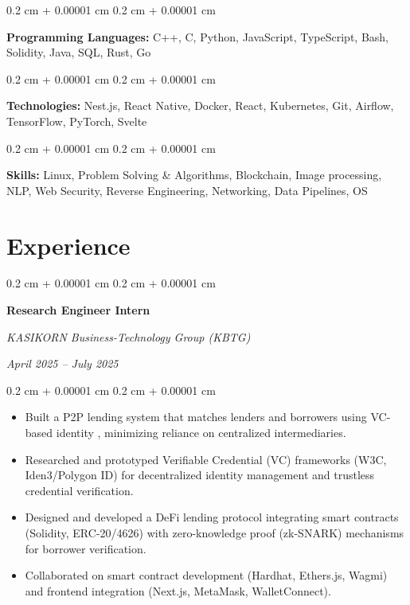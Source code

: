 \documentclass[10pt,letterpaper]{extarticle}
\newenvironment{highlights}{
    \begin{itemize}[
        topsep=0.10 cm,
        parsep=0.10 cm,
        partopsep=0pt,
        itemsep=0pt,
        leftmargin=0.4 cm + 10pt
    ]
}{
    \end{itemize}
} %
\newenvironment{onecolentry}{
    \begin{adjustwidth}{
        0.2 cm + 0.00001 cm
    }{
        0.2 cm + 0.00001 cm
    }
}{
    \end{adjustwidth}
} %
\newenvironment{twocolentry}[2][]{
    \onecolentry
    \def\secondColumn{#2}
    \setcolumnwidth{\fill, 5.0 cm}
    \begin{paracol}{2}
}{
    \switchcolumn \raggedleft \secondColumn
    \end{paracol}
    \endonecolentry
} %
\begin{document}
        \begin{onecolentry}
            \textbf{Programming Languages:} C++, C, Python, JavaScript, TypeScript, Bash, Solidity, Java, SQL, Rust, Go
        \end{onecolentry}


        \begin{onecolentry}
            \textbf{Technologies:} Nest.js, React Native, Docker, React, Kubernetes, Git, Airflow, TensorFlow, PyTorch, Svelte
        \end{onecolentry}


        \begin{onecolentry}
            \textbf{Skills:} Linux, Problem Solving \& Algorithms, Blockchain, Image processing, NLP, Web Security, Reverse Engineering, Networking, Data Pipelines, OS
        \end{onecolentry}

    \section{Experience}

        \begin{twocolentry}{
            \textit{April 2025 – July 2025}}
            \textbf{Research Engineer Intern}

            \textit{KASIKORN Business-Technology Group (KBTG)}
        \end{twocolentry}

        \vspace{0.10 cm}
        \begin{onecolentry}
            \begin{highlights}
                \item Built a P2P lending system that matches lenders and borrowers using VC-based identity , minimizing reliance on centralized intermediaries.
                \item Researched and prototyped Verifiable Credential (VC) frameworks (W3C, Iden3/Polygon ID) for decentralized identity management and trustless credential verification.
                \item Designed and developed a DeFi lending protocol integrating smart contracts (Solidity, ERC-20/4626) with zero-knowledge proof (zk-SNARK) mechanisms for borrower verification.
                \item Collaborated on smart contract development (Hardhat, Ethers.js, Wagmi) and frontend integration (Next.js, MetaMask, WalletConnect).
            \end{highlights}
        \end{onecolentry}
\end{document}
